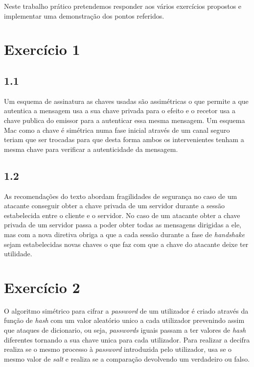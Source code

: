 \documentclass[11pt]{report}
\begin{document}
Neste trabalho prático pretendemos responder aos vários exercícios propostos e implementar uma demonstração dos pontos referidos.

\newpage


\section{Exercício 1}
	\subsection*{1.1}
	Um esquema de assinatura as chaves usadas são assimétricas o que permite a que autentica a mensagem usa a sua chave privada para o efeito e o recetor usa a chave publica do emissor para a autenticar essa mesma mensagem. Um esquema Mac como a chave é simétrica numa fase inicial através de um canal seguro teriam que ser trocadas para que desta forma ambos os intervenientes tenham a mesma chave para verificar a autenticidade da mensagem.
	
	\subsection*{1.2}
	As recomendações do texto abordam fragilidades de segurança no caso de um atacante conseguir obter a chave privada de um servidor durante a sessão estabelecida entre o cliente e o servidor. No caso de um atacante obter a chave privada de um servidor passa a poder obter todas as mensagens dirigidas a ele, mas com a nova diretiva obriga a que a cada sessão durante a fase de \textit{handshake} sejam estabelecidas novas chaves o que faz com que a chave do atacante deixe ter utilidade.

\section{Exercício 2}
	O algoritmo simétrico para cifrar a \textit{password} de um utilizador é criado através da função de \textit{hash} com um valor aleatório unico a cada utilizador prevenindo assim que ataques de dicionario, ou seja, \textit{passwords} iguais passam a ter valores de \textit{hash} diferentes tornando a sua chave unica para cada utilizador. Para realizar a decifra realiza se o mesmo processo à \textit{password} introduzida pelo utilizador, usa se o mesmo valor de \textit{salt} e realiza se a comparação devolvendo um verdadeiro ou falso.
\end{document}
